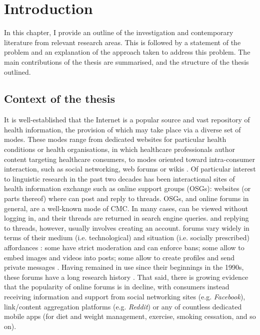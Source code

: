 

\chapter{Introduction} \label{chap:intro}

In this chapter, I provide an outline of the investigation and contemporary literature from relevant research areas. This is followed by a statement of the problem and an explanation of the approach taken to address this problem. The main contributions of the thesis are summarised, and the structure of the thesis outlined.

\section{Context of the thesis}

It is well\hyp{}established that the Internet is a popular source and vast repository of health information, the provision of which may take place via a diverse set of \glspl{mode}. These \glspl{mode} range from dedicated websites for particular health conditions or health organisations, in which healthcare professionals author content targeting healthcare \glspl{consumer}, to \glspl{mode} oriented toward intra\hyp{}consumer interaction, such as social networking, web \glspl{forum} or wikis \cite{sillence_why_2013}. Of particular interest to linguistic research in the past two decades has been interactional sites of health information exchange such as online support groups (\glspl{OSG}): websites (or parts thereof) where  can \gls{post} and reply to \glspl{thread}. \glspl{OSG}, and online \glspl{forum} in general, are a well\hyp{}known \gls{mode} of \gls{CMC}. In many cases,  can be viewed without logging in, and their \glspl{thread} are returned in search engine queries.  and replying to \glspl{thread}, however, usually involves creating an account. \Glspl{forum} vary widely in terms of their medium (i.e. technological) and situation (i.e. socially prescribed) affordances \cite{herring_faceted_2007}: some have strict moderation and can enforce bans; some allow  to embed images and videos into \glspl{post}; some allow  to create profiles and send private messages \cite{morzy_analysis_2012}. Having remained in use since their beginnings in the 1990s, these \glspl{forum} have a long research history \cite[e.g.][]{sharf_communicating_1997}. That said, there is growing evidence that the popularity of online \glspl{forum} is in decline, with consumers instead receiving information and support from social networking sites (e.g. \emph{Facebook}), link\slash content aggregation platforms (e.g. \emph{Reddit}) or any of countless dedicated mobile apps (for diet and weight management, exercise, smoking cessation, and so on).

